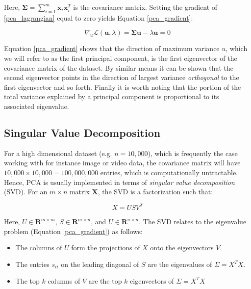 \documentclass[11pt, oneside, a4paper]{report}
\begin{document}
Here, $\boldsymbol{\Sigma} = \sum_{i = 1}^m \boldsymbol{x}_i \boldsymbol{x}_i^T$ is the covariance matrix. Setting the gradient of \ref{pca_lagrangian} equal to zero yields Equation \ref{pca_gradient}:

\begin{equation}
  \label{pca_gradient}
  \nabla_u \mathcal{L}(\boldsymbol{u}, \lambda) = \boldsymbol{\Sigma} \boldsymbol{u} - \lambda \boldsymbol{u} = 0
\end{equation}

Equation \ref{pca_gradient} shows that the direction of maximum variance $u$, which we will refer to as the first principal component, is the first eigenvector of the covariance matrix of the dataset. By similar means it can be shown that the second eigenvector points in the direction of largest variance \emph{orthogonal} to the first eigenvector and so forth. Finally it is worth noting that the portion of the total variance explained by a principal component is proportional to its associated eigenvalue.

\subsection{Singular Value Decomposition}

For a high dimensional dataset (e.g. $n = 10,000$), which is
frequently the case working with for instance image or video data, the covariance matrix will have $10,000\times 10,000 = 100,000,000$ entries, which is computationally untractable. Hence, PCA is usually implemented in terms of \emph{singular value decomposition} (SVD). For an $m\times n$ matrix $\boldsymbol{X}$, the SVD is a factorization such that:

\begin{equation}
  X = US V^{T}
\end{equation}

Here, $U \in \mathbf{R}^{m\times m}$, $S \in \mathbf{R}^{m\times n}$,
and $U \in \mathbf{R}^{n\times n}$. The SVD relates to the eigenvalue
problem (Equation \ref{pca_gradient}) as follows:

\begin{itemize}
\item The columns of $U$ form the projections of $X$ onto the
  eigenvectors $V$.
  \item The entries $s_{ii}$ on the leading diagonal of $S$ are the
    eigenvalues of $\Sigma = X^TX$.
  \item The top $k$ columns of $V$ are the top $k$ eigenvectors of
    $\Sigma = X^T X$
\end{itemize}
\end{document}
